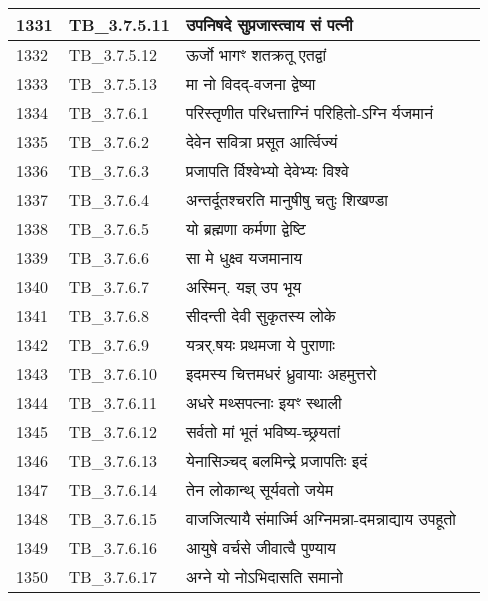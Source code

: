 \documentclass[17pt]{extarticle}
\begin{document}
\begin{longtable}{||p{0.4in}||p{0.9in}||p{4.0in}||p{0.9in}||}
        \hline
            1331 & TB\_3.7.5.11 & उपनिषदे सुप्रजास्त्वाय सं पत्नी &      \\
        \hline
            1332 & TB\_3.7.5.12 & ऊर्जो भागꣳ शतक्रतू एतद्वां &      \\
        \hline
            1333 & TB\_3.7.5.13 & मा नो विदद्{-}वजना द्वेष्या &      \\
        \hline
            1334 & TB\_3.7.6.1 & परिस्तृणीत परिधत्ताग्निं परिहितो{-}ऽग्नि र्यजमानं &      \\
        \hline
            1335 & TB\_3.7.6.2 & देवेन सवित्रा प्रसूत आर्त्विज्यं &      \\
        \hline
            1336 & TB\_3.7.6.3 & प्रजापति र्विश्वेभ्यो देवेभ्यः विश्वे &      \\
        \hline
            1337 & TB\_3.7.6.4 & अन्तर्दूतश्चरति मानुषीषु चतुः शिखण्डा &      \\
        \hline
            1338 & TB\_3.7.6.5 & यो ब्रह्मणा कर्मणा द्वेष्टि &      \\
        \hline
            1339 & TB\_3.7.6.6 & सा मे धुक्ष्व यजमानाय &      \\
        \hline
            1340 & TB\_3.7.6.7 & अस्मिन्. यज्ञ् उप भूय &      \\
        \hline
            1341 & TB\_3.7.6.8 & सीदन्ती देवी सुकृतस्य लोके &      \\
        \hline
            1342 & TB\_3.7.6.9 & यत्रर्.षयः प्रथमजा ये पुराणाः &      \\
        \hline
            1343 & TB\_3.7.6.10 & इदमस्य चित्तमधरं ध्रुवायाः अहमुत्तरो &      \\
        \hline
            1344 & TB\_3.7.6.11 & अधरे मथ्सपत्नाः इयꣳ स्थाली &      \\
        \hline
            1345 & TB\_3.7.6.12 & सर्वतो मां भूतं भविष्य{-}च्छ्रयतां &      \\
        \hline
            1346 & TB\_3.7.6.13 & येनासिञ्चद् बलमिन्द्रे प्रजापतिः इदं &      \\
        \hline
            1347 & TB\_3.7.6.14 & तेन लोकान्थ् सूर्यवतो जयेम &      \\
        \hline
            1348 & TB\_3.7.6.15 & वाजजित्यायै संमार्ज्मि अग्निमन्ना{-}दमन्नाद्याय उपहूतो &      \\
        \hline
            1349 & TB\_3.7.6.16 & आयुषे वर्चसे जीवात्वै पुण्याय &      \\
        \hline
            1350 & TB\_3.7.6.17 & अग्ने यो नोऽभिदासति समानो &      \\

\end{longtable}
\end{document}
